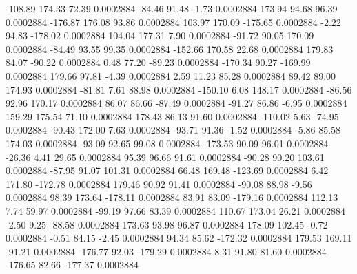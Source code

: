      -108.89      174.33       72.39     0.0002884
      -84.46       91.48       -1.73     0.0002884
      173.94       94.68       96.39     0.0002884
     -176.87      176.08       93.86     0.0002884
      103.97      170.09     -175.65     0.0002884
       -2.22       94.83     -178.02     0.0002884
      104.04      177.31        7.90     0.0002884
      -91.72       90.05      170.09     0.0002884
      -84.49       93.55       99.35     0.0002884
     -152.66      170.58       22.68     0.0002884
      179.83       84.07      -90.22     0.0002884
        0.48       77.20      -89.23     0.0002884
     -170.34       90.27     -169.99     0.0002884
      179.66       97.81       -4.39     0.0002884
        2.59       11.23       85.28     0.0002884
       89.42       89.00      174.93     0.0002884
      -81.81        7.61       88.98     0.0002884
     -150.10        6.08      148.17     0.0002884
      -86.56       92.96      170.17     0.0002884
       86.07       86.66      -87.49     0.0002884
      -91.27       86.86       -6.95     0.0002884
      159.29      175.54       71.10     0.0002884
      178.43       86.13       91.60     0.0002884
     -110.02        5.63      -74.95     0.0002884
      -90.43      172.00        7.63     0.0002884
      -93.71       91.36       -1.52     0.0002884
       -5.86       85.58      174.03     0.0002884
      -93.09       92.65       99.08     0.0002884
     -173.53       90.09       96.01     0.0002884
      -26.36        4.41       29.65     0.0002884
       95.39       96.66       91.61     0.0002884
      -90.28       90.20      103.61     0.0002884
      -87.95       91.07      101.31     0.0002884
       66.48      169.48     -123.69     0.0002884
        6.42      171.80     -172.78     0.0002884
      179.46       90.92       91.41     0.0002884
      -90.08       88.98       -9.56     0.0002884
       98.39      173.64     -178.11     0.0002884
       83.91       83.09     -179.16     0.0002884
      112.13        7.74       59.97     0.0002884
      -99.19       97.66       83.39     0.0002884
      110.67      173.04       26.21     0.0002884
       -2.50        9.25      -88.58     0.0002884
      173.63       93.98       96.87     0.0002884
      178.09      102.45       -0.72     0.0002884
       -0.51       84.15       -2.45     0.0002884
       94.34       85.62     -172.32     0.0002884
      179.53      169.11      -91.21     0.0002884
     -176.77       92.03     -179.29     0.0002884
        8.31       91.80       81.60     0.0002884
     -176.65       82.66     -177.37     0.0002884
